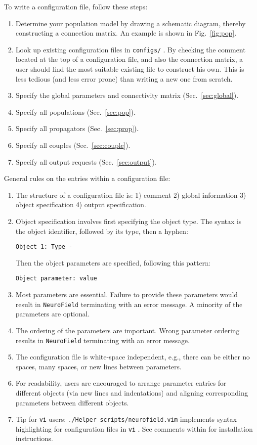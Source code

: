 \documentclass[12pt,a4paper]{article}
\newcommand{\type}[1]{{\small\small\tt #1} }
\newcommand{\NF}[0]{\type{NeuroField}}
\begin{document}
To write a configuration file, follow these steps:
\begin{enumerate}
\item Determine your population model by drawing a schematic diagram, thereby constructing a connection matrix. An example is shown in Fig.~\ref{fig:pop}.
\item Look up existing configuration files in \type{configs/}. By checking the comment located at the top of a configuration file, and also the connection matrix, a user should find the most suitable existing file to construct his own. This is less tedious (and less error prone) than writing a new one from scratch.
\item Specify the global parameters and connectivity matrix (Sec.~\ref{sec:global}).
\item Specify all populations (Sec.~\ref{sec:pop}).
\item Specify all propagators (Sec.~\ref{sec:prop}).
\item Specify all couples (Sec.~\ref{sec:couple}).
\item Specify all output requests (Sec.~\ref{sec:output}).
\end{enumerate}

General rules on the entries within a configuration file:

\begin{enumerate}
	\item The structure of a configuration file is: 1) comment 2) global information 3) object specification 4) output specification.
	\item Object specification involves first specifying the object type. The syntax is the object identifier, followed by its type, then a hyphen:
		\begin{lstlisting}
Object 1: Type -
		\end{lstlisting}
		Then the object parameters are specified, following this pattern:
		\begin{lstlisting}
Object parameter: value
		\end{lstlisting}
	\item Most parameters are essential. Failure to provide these parameters would result in \NF terminating with an error message. A minority of the parameters are optional.
	\item The ordering of the parameters are important. Wrong parameter ordering results in \NF terminating with an error message.
	\item The configuration file is white-space independent, e.g., there can be either no spaces, many spaces, or new lines between parameters.
	\item For readability, users are encouraged to arrange parameter entries for different objects (via new lines and indentations) and aligning corresponding parameters between different objects.
	\item Tip for \type{vi} users: \type{./Helper\_scripts/neurofield.vim} implements syntax highlighting for configuration files in \type{vi}. See comments within for installation instructions.
\end{enumerate}
\end{document}
